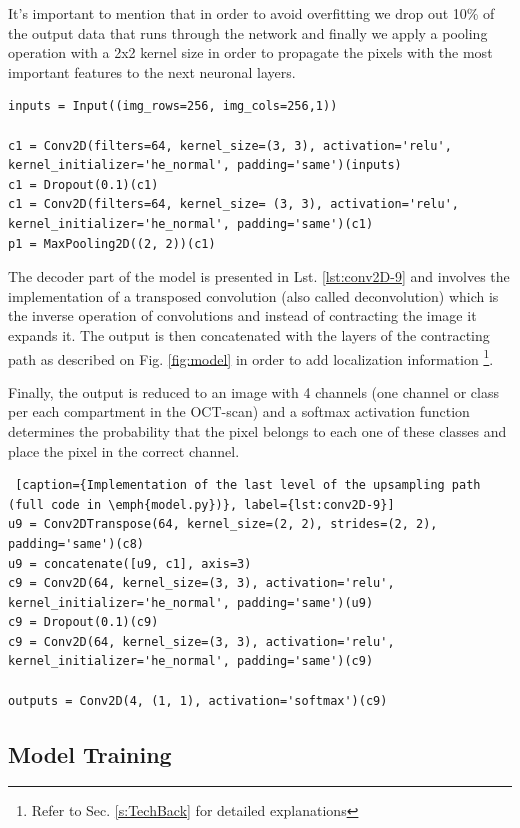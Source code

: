 \documentclass[12pt,a4paper]{scrartcl}
\begin{document}
It's important to mention that in order to avoid overfitting we drop out 10\% of the output data that runs through the network and finally we apply a pooling operation with a 2x2 kernel size in order to propagate the pixels with the most important features to the next neuronal layers.

\begin{lstlisting}[caption={Implementation of the first level of the contracting path, the rest of the layer can be found in the \emph{get\_unet()} method from \emph{model.py}}, label={lst:conv2D-1}]
inputs = Input((img_rows=256, img_cols=256,1))

c1 = Conv2D(filters=64, kernel_size=(3, 3), activation='relu', kernel_initializer='he_normal', padding='same')(inputs)
c1 = Dropout(0.1)(c1)
c1 = Conv2D(filters=64, kernel_size= (3, 3), activation='relu', kernel_initializer='he_normal', padding='same')(c1)
p1 = MaxPooling2D((2, 2))(c1)
\end{lstlisting}

The decoder part of the model is presented in Lst. \ref{lst:conv2D-9} and involves the implementation of a transposed convolution (also called deconvolution) which is the inverse operation of convolutions and instead of contracting the image it expands it. The output is then concatenated with the layers of the contracting path as described on Fig. \ref{fig:model} in order to add localization information \footnote{Refer to Sec. \ref{s:TechBack} for detailed explanations}.


Finally, the output is reduced to an image with 4 channels (one channel or class per each compartment in the OCT-scan) and a softmax activation function determines the probability that the pixel belongs to each one of these classes and place the pixel in the correct channel.

\begin{lstlisting} [caption={Implementation of the last level of the upsampling path (full code in \emph{model.py})}, label={lst:conv2D-9}]
u9 = Conv2DTranspose(64, kernel_size=(2, 2), strides=(2, 2), padding='same')(c8)
u9 = concatenate([u9, c1], axis=3)
c9 = Conv2D(64, kernel_size=(3, 3), activation='relu', kernel_initializer='he_normal', padding='same')(u9)
c9 = Dropout(0.1)(c9)
c9 = Conv2D(64, kernel_size=(3, 3), activation='relu', kernel_initializer='he_normal', padding='same')(c9)
 
outputs = Conv2D(4, (1, 1), activation='softmax')(c9)
\end{lstlisting}
\subsection{Model Training}\label{ss:model_training}
\end{document}
